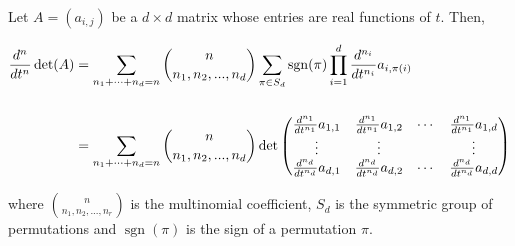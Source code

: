 \documentclass[12pt]{article}
\DeclareMathOperator{\sgn}{\mathrm{sgn}}
\begin{document}
Let $ A= (a_{i,j})$ be a $d \times d$ matrix whose entries are real functions of $t$. Then,

\[\begin{split}
\frac{d^n}{dt^n}\det(A)
&=\sum_{n_1+\cdots+n_d=n} {n \choose n_1,n_2,...,n_d} \sum_{\pi \in S_d} \sgn(\pi) \prod_{i=1}^{d} \frac{d^{n_i}}{dt^{n_i}}a_{i,\pi(i)}\\
\\
&= \sum_{n_1+\cdots+n_d=n} {n \choose n_1,n_2,...,n_d} \det \begin{pmatrix} \frac{ d^{n_1}}{dt^{n_1}}a_{1,1} & \frac{ d^{n_1}}{dt^{n_1}}a_{1,2} &  \cdots
&\frac{d^{n_1}}{dt^{n_1}}a_{1,d} \cr \vdots & \vdots &  & \vdots \cr \frac{d^{n_d}}{dt^{n_d}}a_{d,1} & \frac{d^{n_d}}{dt^{n_d}}a_{d,2} & \cdots &
\frac{d^{n_d}}{dt^{n_d}}a_{d,d}
\end{pmatrix}
\end{split}\]

where $ {n \choose n_1,n_2,...,n_r}$ is the multinomial coefficient, $S_d$ is the symmetric group of permutations and $\sgn(\pi)$ is the sign of a
permutation $\pi$.
\end{document}

